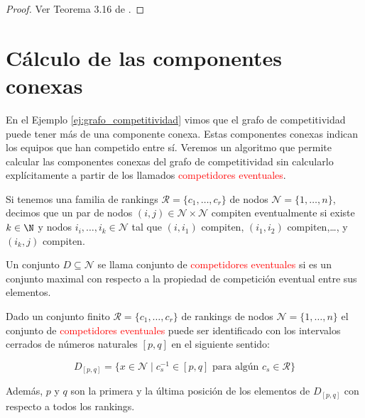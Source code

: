 \begin{proof}
Ver Teorema 3.16 de \cite{journals/corr/CriadoGPR13a}.
\end{proof}


\section{Cálculo de las componentes conexas}

En el Ejemplo \ref{ej:grafo_competitividad} vimos que el grafo de competitividad puede tener más de una componente conexa. Estas componentes conexas indican los equipos que han competido entre sí. Veremos un algoritmo que permite calcular las componentes conexas del grafo de competitividad sin calcularlo explícitamente a partir de los llamados \textcolor{red}{competidores eventuales}.

\begin{defi}
Si tenemos una familia de rankings $\mathcal{R} = \{c_1,\dots,c_r\}$ de nodos $\mathcal{N} = \{1,\dots,n\}$, decimos que un par de nodos $(i,j) \in \mathcal{N} \times \mathcal{N}$ compiten eventualmente si existe $k \in \N$ y nodos $i_i,\dots,i_k \in \mathcal{N}$ tal que $(i,i_1)$ compiten, $(i_1,i_2)$ compiten,\dots, y $(i_k,j)$ compiten. 
\end{defi}

\begin{defi}
Un conjunto $D \subseteq \mathcal{N}$ se llama conjunto de \textcolor{red}{competidores eventuales} si es un conjunto maximal con respecto a la propiedad de competición eventual entre sus elementos.
\end{defi}

\begin{teo}
Dado un conjunto finito $\mathcal{R} = \{ c_1, \dots, c_r \}$ de rankings de nodos $\mathcal{N} = \{1,\dots, n\}$ el conjunto de \textcolor{red}{competidores eventuales} puede ser identificado con los intervalos cerrados de números naturales $[p,q]$ en el siguiente sentido:

\begin{equation*}
D_{[p,q]} = \{ x \in \mathcal{N} \mid c_s^{-1} \in [p,q] \text{ para algún } c_s \in \mathcal{R} \}
\end{equation*}

Además, $p$ y $q$ son la primera y la última posición de los elementos de $D_{[p,q]}$ con respecto a todos los rankings.
\end{teo} 

